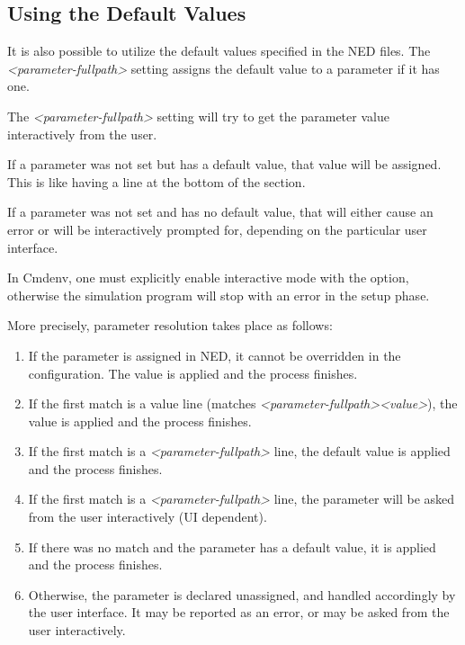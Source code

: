 \subsection{Using the Default Values}
\label{sec:config-sim:using-default-values}

It is also possible to utilize the default values specified in the NED files.
The \textit{<parameter-fullpath>} setting assigns
the default value to a parameter if it has one.

The \textit{<parameter-fullpath>} setting will try to get the parameter
value interactively from the user.

If a parameter was not set but has a default value, that value will be
assigned. This is like having a  line at the
bottom of the \ttt{[General]} section.

If a parameter was not set and has no default value, that will either
cause an error or will be interactively prompted for, depending
on the particular user interface.

\begin{note}
In Cmdenv, one must explicitly enable interactive mode with the
 option, otherwise the simulation
program will stop with an error in the setup phase.
\end{note}

More precisely, parameter resolution takes place as follows:

\begin{enumerate}
\item If the parameter is assigned in NED, it cannot be overridden in the
    configuration. The value is applied and the process finishes.
\item If the first match is a value line (matches
    \textit{<parameter-fullpath>}\ttt{=}\textit{<value>}), the value is
    applied and the process finishes.
\item If the first match is a \textit{<parameter-fullpath>} line,
    the default value is applied and the process finishes.
\item If the first match is a \textit{<parameter-fullpath>} line,
    the parameter will be asked from the user interactively (UI dependent).
\item If there was no match and the parameter has a default value, it is applied
    and the process finishes.
\item Otherwise, the parameter is declared unassigned, and handled accordingly
    by the user interface. It may be reported as an error, or may be
    asked from the user interactively.
\end{enumerate}



